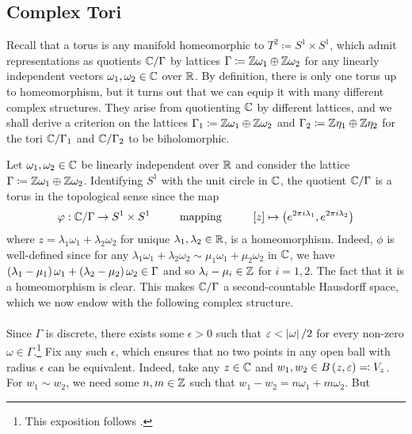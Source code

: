 \documentclass[../Moduli_Spaces_of_Riemann_Surfaces.tex]{subfiles}
\begin{document}
    \subsection{Complex Tori}
    Recall that a torus is any manifold homeomorphic to $T^2\coloneqq S^1\times S^1$, which admit representations as quotients $\mathbb{C}/\Gamma$ by lattices $\Gamma\coloneqq\mathbb{Z}\omega_1\oplus\mathbb{Z}\omega_2$ for any linearly independent vectors $\omega_1,\omega_2\in\mathbb{C}$ over $\mathbb{R}$. By definition, there is only one torus up to homeomorphism, but it turns out that we can equip it with many different complex structures. They arise from quotienting $\mathbb{C}$ by different lattices, and we shall derive a criterion on the lattices $\Gamma_1\coloneqq\mathbb{Z}\omega_1\oplus\mathbb{Z}\omega_2$ and $\Gamma_2\coloneqq\mathbb{Z}\eta_1\oplus\mathbb{Z}\eta_2$ for the tori $\mathbb{C}/\Gamma_1$ and $\mathbb{C}/\Gamma_2$ to be biholomorphic.
    \begin{example}\label{RS:exa:tori}
        Let $\omega_1,\omega_2\in\mathbb{C}$ be linearly independent over $\mathbb{R}$ and consider the lattice $\Gamma\coloneqq\mathbb{Z}\omega_1\oplus\mathbb{Z}\omega_2$. Identifying $S^1$ with the unit circle in $\mathbb{C}$, the quotient $\mathbb{C}/\Gamma$ is a torus in the topological sense since the map
        \begin{equation*}
            \phi:\C/\Gamma\to S^1\times S^1\ \ \ \ \ \ \ \ \textrm{mapping}\ \ \ \ \ \ \ \ \l[z\r]\mapsto\big(e^{2\pi i\lambda_1},e^{2\pi i\lambda_2}\big)
        \end{equation*}
        where $z=\lambda_1\omega_1+\lambda_2\omega_2$ for unique $\lambda_1,\lambda_2\in\mathbb{R}$, is a homeomorphism. Indeed, $\phi$ is well-defined since for any $\lambda_1\omega_1+\lambda_2\omega_2\sim\mu_1\omega_1+\mu_2\omega_2$ in $\mathbb{C}$, we have $\left(\lambda_1-\mu_1\right)\omega_1+\left(\lambda_2-\mu_2\right)\omega_2\in\Gamma$ and so $\lambda_i-\mu_i\in\mathbb{Z}$ for $i=1,2$. The fact that it is a homeomorphism is clear. This makes $\mathbb{C}/\Gamma$ a second-countable Hausdorff space, which we now endow with the following complex structure.\\\ \\
        Since $\Gamma$ is discrete, there exists some $\epsilon>0$ such that $\varepsilon<\left|\omega\right|/2$ for every non-zero $\omega\in\Gamma$.\footnote{This exposition follows \cite[][Section I.2]{miranda}.} Fix any such $\epsilon$, which ensures that no two points in any open ball with radius $\epsilon$ can be equivalent. Indeed, take any $z\in\mathbb{C}$ and $w_1,w_2\in B\left(z,\varepsilon\right)\eqqcolon V_z$. For $w_1\sim w_2$, we need some $n,m\in\mathbb{Z}$ such that $w_1-w_2=n\omega_1+m\omega_2$. But
        \begin{equation*}

\end{equation*}
\end{example}
\end{document}
